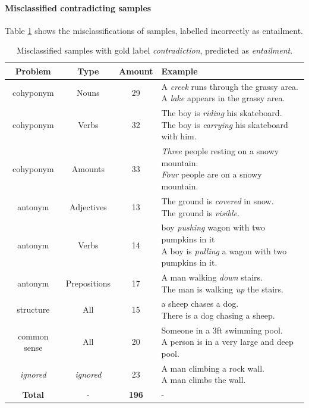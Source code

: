 \paragraph*{Misclassified contradicting samples}
Table \ref{tab:misclassified_orig_contr} shows the misclassifications of samples, labelled incorrectly as entailment.
\begin{table}[tph!]\label{tab:misclassified_orig_contr}
\centering
\begin{tabular}{cccl}
\textbf{Problem} & \textbf{Type} & \textbf{Amount} & \textbf{Example} \\
\toprule
cohyponym & Nouns & 29 & \specialcell{A \textit{creek} runs through the grassy area.\\A \textit{lake} appears in the grassy area.}\\
cohyponym & Verbs & 32 & \specialcell{The boy is \textit{riding} his skateboard.\\The boy is \textit{carrying} his skateboard with him.}\\
cohyponym & Amounts & 33 & \specialcell{\textit{Three} people resting on a snowy mountain.\\\textit{Four} people are on a snowy mountain.}\\
antonym & Adjectives & 13 & \specialcell{The ground is \textit{covered} in snow.\\The ground is \textit{visible}.}\\
antonym & Verbs & 14 & \specialcell{boy \textit{pushing} wagon with two pumpkins in it\\A boy is \textit{pulling} a wagon with two pumpkins in it.}\\
antonym & Prepositions & 17 & \specialcell{A man walking \textit{down} stairs.\\The man is walking \textit{up} the stairs.}\\
\midrule
structure & All & 15 & \specialcell{a sheep chases a dog.\\There is a dog chasing a sheep.}\\
common sense & All & 20 & \specialcell{Someone in a 3ft swimming pool.\\A person is in a very large and deep pool.}\\
\midrule
\textit{ignored} & \textit{ignored} & 23 & \specialcell{A man climbing a rock wall.\\A man climbs the wall.}\\
\midrule
\textbf{Total} & - & \textbf{196} & - \\
\bottomrule      
\end{tabular}
\caption{Misclassified samples with gold label \textit{contradiction}, predicted as \textit{entailment}.}
\end{table}
